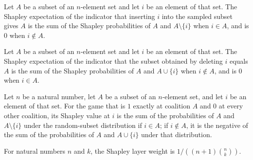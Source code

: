 \begin{theorem}
\label{FABL.shapleyExpectation_pointIndicator_insert}
\leanok
{}
Let $A$ be a subset of an $n$-element set and let $i$ be an element of that set. The
Shapley expectation of the indicator that inserting $i$ into the sampled subset gives
$A$ is the sum of the Shapley probabilities of $A$ and $A\setminus\{i\}$ when $i\in A$,
and is $0$ when $i\notin A$.
\end{theorem}

\begin{theorem}
\label{FABL.shapleyExpectation_pointIndicator_erase}
\leanok
{}
Let $A$ be a subset of an $n$-element set and let $i$ be an element of that set. The
Shapley expectation of the indicator that the subset obtained by deleting $i$ equals $A$
is the sum of the Shapley probabilities of $A$ and $A\cup\{i\}$ when $i\notin A$, and is
$0$ when $i\in A$.
\end{theorem}

\begin{theorem}
\label{FABL.shapleyValue_subsetPointIndicator}
\leanok
{}
Let $n$ be a natural number, let $A$ be a subset of an $n$-element set, and let $i$ be
an element of that set. For the game that is $1$ exactly at coalition $A$ and $0$ at
every other coalition, its Shapley value at $i$ is the sum of the probabilities of $A$
and $A\setminus\{i\}$ under the random-subset distribution if $i\in A$; if $i\notin A$,
it is the negative of the sum of the probabilities of $A$ and $A\cup\{i\}$ under that
distribution.
\end{theorem}

\begin{definition}
\label{FABL.shapleyLayerWeight}
\leanok
For natural numbers $n$ and $k$, the Shapley layer weight is $1/((n+1)\binom{n}{k})$.
\end{definition}

